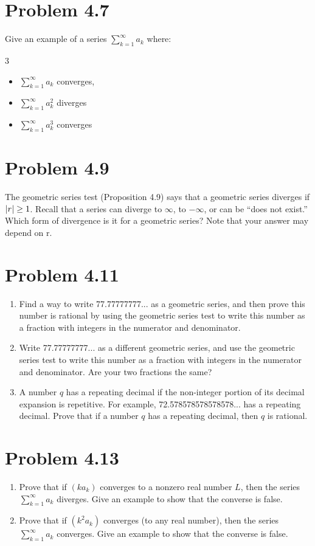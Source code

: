 \documentclass[12pt]{report}
\begin{document}
\section{Problem 4.7}
    Give an example of a series $\sum_{k = 1}^{\infty} a_k$ where:
    \begin{multicols}{3}
        \begin{itemize}
            \item {\small $\sum_{k = 1}^{\infty} a_k$ converges,}
            \item {\small $\sum_{k = 1}^{\infty} a_k^2$ diverges}
            \item $\sum_{k = 1}^{\infty} a_k^3$ converges
        \end{itemize}
    \end{multicols}

\section{Problem 4.9}
    The geometric series test (Proposition 4.9) says  that a geometric series diverges if $\left| r \right| \geq 1$. 
    Recall that a series can  diverge to $\infty$, to $-\infty$, or can be ``does not exist.'' 
    Which form of divergence is it for a geometric series? 
    Note that your answer may depend on r. 

\section{Problem 4.11}
    \begin{enumerate}[label=(\alph*)]
        \item   Find a way to write 77.77777777... as a geometric series, and then prove this number is rational by using the geometric series test to write this number as a fraction with integers in the numerator and denominator.
        \item   Write 77.77777777... as a different geometric series, and use the geometric series test to write this number as a fraction with integers in the numerator and denominator. Are your two fractions the same?
        \item   A number $q$ has a repeating decimal if the non-integer portion of its decimal expansion is repetitive. For example, 72.578578578578578... has a repeating decimal. Prove that if a number $q$ has a repeating  decimal, then $q$ is rational. 
    \end{enumerate}
\pagebreak

\section{Problem 4.13}
    \begin{enumerate}[label=(\alph*)]
        \item   Prove that if $(k a_k)$ converges to a nonzero real number $L$, then  the series $\sum_{k = 1}^{\infty} a_k$ diverges. Give an example to show that the  converse is false. 
        \item   Prove that if $(k^2 a_k)$ converges (to any real number), then the  series $\sum_{k = 1}^{\infty} a_k$ converges. Give an example to show that the  converse is false. 
    \end{enumerate}
\end{document}
